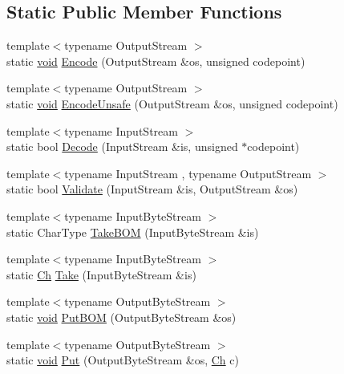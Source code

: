 \subsection*{Static Public Member Functions}
\begin{DoxyCompactItemize}
\item 
{\footnotesize template$<$typename Output\+Stream $>$ }\\static \hyperlink{imgui__impl__opengl3__loader_8h_ac668e7cffd9e2e9cfee428b9b2f34fa7}{void} \hyperlink{structASCII_af56b1605fe233c54693facc7de457f72}{Encode} (Output\+Stream \&os, unsigned codepoint)
\item 
{\footnotesize template$<$typename Output\+Stream $>$ }\\static \hyperlink{imgui__impl__opengl3__loader_8h_ac668e7cffd9e2e9cfee428b9b2f34fa7}{void} \hyperlink{structASCII_afeb90d6f04771067b83b35a0f366af46}{Encode\+Unsafe} (Output\+Stream \&os, unsigned codepoint)
\item 
{\footnotesize template$<$typename Input\+Stream $>$ }\\static bool \hyperlink{structASCII_a44844bbfd0a4fc282993fd72f3f58eee}{Decode} (Input\+Stream \&is, unsigned $\ast$codepoint)
\item 
{\footnotesize template$<$typename Input\+Stream , typename Output\+Stream $>$ }\\static bool \hyperlink{structASCII_a398680588a09e6ce9b56e32195047c78}{Validate} (Input\+Stream \&is, Output\+Stream \&os)
\item 
{\footnotesize template$<$typename Input\+Byte\+Stream $>$ }\\static Char\+Type \hyperlink{structASCII_aad78500eb98f45582a4df020e3fb2278}{Take\+B\+OM} (Input\+Byte\+Stream \&is)
\item 
{\footnotesize template$<$typename Input\+Byte\+Stream $>$ }\\static \hyperlink{structASCII_a1baf6e7914f165be952c30db664cefb4}{Ch} \hyperlink{structASCII_ab1b9fdf0a5c05658d62fded913d923a3}{Take} (Input\+Byte\+Stream \&is)
\item 
{\footnotesize template$<$typename Output\+Byte\+Stream $>$ }\\static \hyperlink{imgui__impl__opengl3__loader_8h_ac668e7cffd9e2e9cfee428b9b2f34fa7}{void} \hyperlink{structASCII_a3036dc1d604039c3224ca0a890ee0134}{Put\+B\+OM} (Output\+Byte\+Stream \&os)
\item 
{\footnotesize template$<$typename Output\+Byte\+Stream $>$ }\\static \hyperlink{imgui__impl__opengl3__loader_8h_ac668e7cffd9e2e9cfee428b9b2f34fa7}{void} \hyperlink{structASCII_a218b244b9cd961ea6c5775a734cec20e}{Put} (Output\+Byte\+Stream \&os, \hyperlink{structASCII_a1baf6e7914f165be952c30db664cefb4}{Ch} c)
\end{DoxyCompactItemize}


